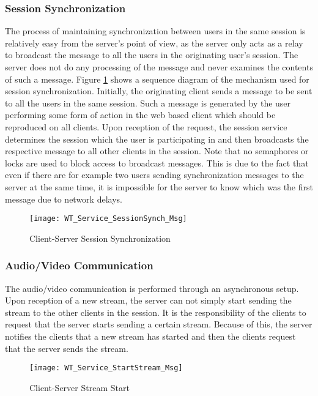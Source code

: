 \subsubsection*{Session Synchronization}

The process of maintaining synchronization between users in the same session is relatively easy from the server's point of view, as the server only acts as a relay to broadcast the message to all the users in the originating user's session. The server does not do any processing of the message and never examines the contents of such a message. Figure \ref{fig:sesssynchdiag} shows a sequence diagram of the mechanism used for session synchronization. Initially, the originating client sends a message to be sent to all the users in the same session. Such a message is generated by the user performing some form of action in the web based client which should be reproduced on all clients. Upon reception of the request, the session service determines the session which the user is participating in and then broadcasts the respective message to all other clients in the session. Note that no semaphores or locks are used to block access to broadcast messages. This is due to the fact that even if there are for example two users sending synchronization messages to the server at the same time, it is impossible for the server to know which was the first message due to network delays.

\begin{figure}
	\centering
	\texttt{[image: WT\_Service\_SessionSynch\_Msg]}
	\caption{Client-Server Session Synchronization}
	\label{fig:sesssynchdiag}
\end{figure}

\subsubsection*{Audio/Video Communication}

The audio/video communication is performed through an asynchronous setup. Upon reception of a new stream, the server can not simply start sending the stream to the other clients in the session. It is the responsibility of the clients to request that the server starts sending a certain stream. Because of this, the server notifies the clients that a new stream has started and then the clients request that the server sends the stream.

\begin{figure}
	\centering
	\texttt{[image: WT\_Service\_StartStream\_Msg]}
	\caption{Client-Server Stream Start}
	\label{fig:sessstreamstart}
\end{figure}

